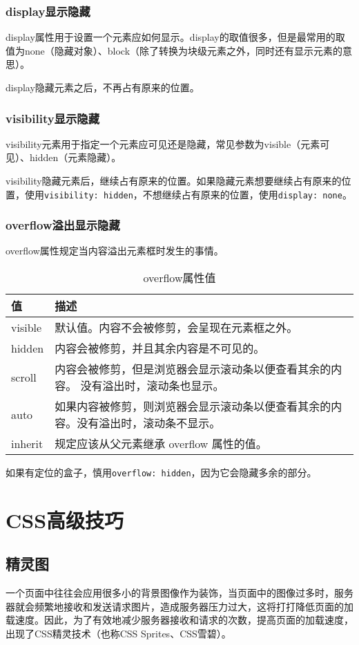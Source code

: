 \subsection{display显示隐藏}
display属性用于设置一个元素应如何显示。display的取值很多，但是最常用的取值为none（隐藏对象）、block（除了转换为块级元素之外，同时还有显示元素的意思）。

display隐藏元素之后，不再占有原来的位置。
\subsection{visibility显示隐藏}
visibility元素用于指定一个元素应可见还是隐藏，常见参数为visible（元素可见）、hidden（元素隐藏）。

visibility隐藏元素后，继续占有原来的位置。如果隐藏元素想要继续占有原来的位置，使用\verb|visibility: hidden|，不想继续占有原来的位置，使用\verb|display: none|。
\subsection{overflow溢出显示隐藏}
overflow属性规定当内容溢出元素框时发生的事情。
\begin{table}[H]
	\caption{overflow属性值}
	\centering\begin{tabular}{ll}

		\hline
		值       & 描述                                         \\
		\hline
		visible & 默认值。内容不会被修剪，会呈现在元素框之外。                     \\
		hidden  & 内容会被修剪，并且其余内容是不可见的。                        \\
		scroll  & 内容会被修剪，但是浏览器会显示滚动条以便查看其余的内容。 没有溢出时，滚动条也显示。 \\
		auto    & 如果内容被修剪，则浏览器会显示滚动条以便查看其余的内容。没有溢出时，滚动条不显示。  \\
		inherit & 规定应该从父元素继承 overflow 属性的值。                  \\
		\hline
	\end{tabular}
\end{table}

如果有定位的盒子，慎用\verb|overflow: hidden|，因为它会隐藏多余的部分。
\chapter{CSS高级技巧}
\section{精灵图}
一个页面中往往会应用很多小的背景图像作为装饰，当页面中的图像过多时，服务器就会频繁地接收和发送请求图片，造成服务器压力过大，这将打打降低页面的加载速度。因此，为了有效地减少服务器接收和请求的次数，提高页面的加载速度，出现了CSS精灵技术（也称CSS Sprites、CSS雪碧）。

